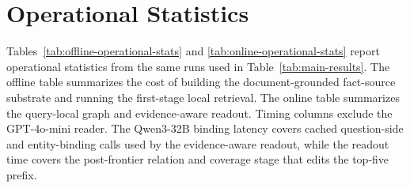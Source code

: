 \begin{table}[h]
\centering
\scriptsize
\setlength{\tabcolsep}{3pt}
\caption{Bootstrap confidence intervals for key main-table and
ablation comparisons. Values are percentages, and brackets give 95\%
percentile intervals. Positive deltas mean \methodname{} is higher
than the comparison system.}
\label{tab:bootstrap-ci}
\end{table}

\section{Operational Statistics}
\label{app:operational-stats}

Tables~\ref{tab:offline-operational-stats} and
\ref{tab:online-operational-stats} report operational statistics from
the same runs used in Table~\ref{tab:main-results}. The offline table
summarizes the cost of building the document-grounded fact-source
substrate and running the first-stage local retrieval. The online table
summarizes the query-local graph and evidence-aware readout. Timing
columns exclude the GPT-4o-mini reader. The Qwen3-32B binding latency
covers cached question-side and entity-binding calls used by the
evidence-aware readout, while the readout time covers the post-frontier
relation and coverage stage that edits the top-five prefix.

\begin{table}[h]
\centering
\scriptsize
\setlength{\tabcolsep}{3pt}
\caption{Offline corpus statistics for \methodname{}. Fresh
index+retrieval is the wall-clock time of the corresponding full
1{,}000-query run when the OpenIE index and retrieval report were
rebuilt from the raw corpus under Qwen3-32B and NV-Embed-v2.}
\label{tab:offline-operational-stats}
\end{table}


